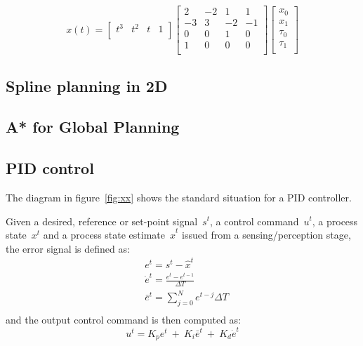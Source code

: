\begin{equation}
x(t) = \left[
 \begin{array}{cccc}
  t^3 & t^2 & t & 1 \\
 \end{array}
 \right]
 \left[
 \begin{array}{cccc}
  2 & -2 & 1 & 1 \\
  -3 & 3 & -2 & -1\\
  0 & 0 & 1 & 0 \\
  1 & 0 & 0 & 0 \\
 \end{array}
 \right]
 \left[
 \begin{array}{c}
  x_0 \\
  x_1\\
  \tau_0 \\
  \tau_1\\
 \end{array}
 \right]
\end{equation}




\subsection{Spline planning in 2D}

\subsection{A* for Global Planning}

\subsection{PID control}

The diagram in figure~\ref{fig:xx} shows the standard situation for a PID controller. 

Given a desired, reference or set-point signal~$s^t$, a control command~$u^t$, a process state~$x^t$ and a process state estimate~$\hat{x}^t$ issued from a sensing/perception stage, the error signal is defined as: 
\begin{align}
 & e^t = s^t - \hat{x}^t \\
 & \dot{e}^t = \frac{e^t-e^{t-1}}{\Delta T} \\
 & \bar{e}^t = \sum^N_{j=0} e^{t-j}\Delta T \\
\end{align}
and the output control command is then computed as: 
\begin{equation}
 u^t  = K_p e^t \ + \ K_i \bar{e}^t \ + \ K_d \dot{e}^t
\end{equation}


